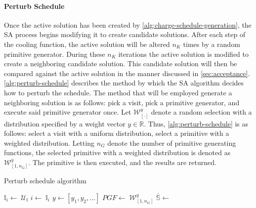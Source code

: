 \documentclass[ee,thesis]{usuthesis}
\newcommand{\I}{\mathbb{I}}                 %
\newcommand{\C}{\mathbb{C}}                 %
\newcommand{\U}{\mathcal{U}}                %
\newcommand{\W}{\mathcal{W}}                %
\newcommand{\Sol}{\mathbb{S}}               %
\begin{document}
\paragraph{Perturb Schedule}
\label{sec:tweak-schedule}
Once the active solution has been created by \ref{alg:charge-schedule-generation}, the SA process begins modifying it to
create candidate solutions. After each step of the cooling function, the active solution will be altered \(n_K\) times by
a random primitive generator. During these \(n_K\) iterations the active solution is modified to create a neighboring
candidate solution. This candidate solution will then be compared against the active solution in the manner discussed in
\ref{sec:acceptance}. \ref{alg:perturb-schedule} describes the method by which the SA algorithm decides how to perturb the
schedule. The method that will be employed generate a neighboring solution is as follows: pick a visit, pick a primitive
generator, and execute said primitive generator once. Let \(\W^y_{[\cdot]}\) denote a random selection with a distribution
specified by a weight vector \(y \in \mathbb{R}\). Thus, \ref{alg:perturb-schedule} is as follows: select a visit with a uniform
distribution, select a primitive with a weighted distribution. Letting \(n_G\) denote the number of primitive generating
functions, the selected primitive with a weighted distribution is denoted as \(\W^y_{[1, n_G]}\). The primitive is then
executed, and the results are returned.

\begin{algorithm}[H]
\scriptsize
\caption{Perturb schedule algorithm} \label{alg:perturb-schedule}

    \LinesNumbered
    \KwIn{$\Sol$}
    \KwOut{$\bar{\Sol}$}


    \Begin
    {
        $\I_i\leftarrow\; \U_{\I}$
        $i \leftarrow\; \I_i$
        $y \leftarrow [y_1, y_2, ...]$
        $PGF \leftarrow\; \W^y_{[1,n_G]}$
        $\bar{\Sol} \leftarrow$ \PGF{($i$, $\I$, $\C$)}
        \Return{($0, \bar{\I}$, $\bar{\C}$)}
    }
\end{algorithm}
\end{document}
